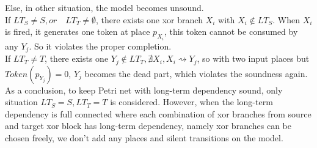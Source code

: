 Else, in other situation, the model becomes unsound. \\
\indent If $LT_S \neq S,or\quad LT_T \neq \emptyset$, there exists one xor branch $X_i$ with $X_i \notin LT_S$. When $X_i$ is fired, it generates one token at place $p_{X_i}$, this token cannot be consumed by any $Y_j$. So it violates the proper completion. \\  
\indent If $LT_T \neq T$, there exists one $Y_j \notin LT_T, \nexists X_i, X_i \rightsquigarrow Y_j$, so with two input places but $Token(p_{Y_j})=0$,  $Y_j$ becomes the dead part, which violates the soundness again. \\

As a conclusion, to keep Petri net with long-term dependency sound, only situation $ LT_S = S, LT_T=T$ is considered. However, when the long-term dependency is full connected where each combination of xor branches from source and target xor block has long-term dependency, namely xor branches can be chosen freely, we don't add any places and silent transitions on the model. 
